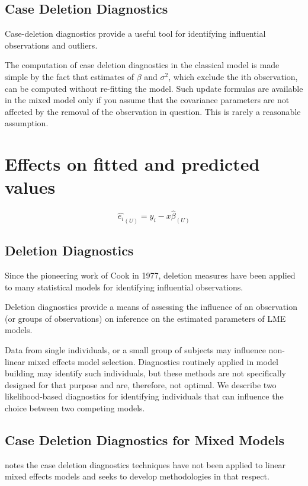 \documentclass[12pt, a4paper]{report}
\theoremstyle{plain}
\theoremstyle{definition}
\theoremstyle{remark}
\begin{document}
\subsection{Case Deletion Diagnostics}
Case-deletion diagnostics provide a useful tool for identifying influential observations and outliers.


The computation of case deletion diagnostics in the classical model is made simple by the fact that estimates of $\beta$ and $\sigma^2$, which exclude the ith observation, can be computed without re-fitting the model. Such update formulas are available in the mixed model only if you assume that the covariance parameters are not affected by the removal of the observation in question. This is rarely a reasonable assumption.

\section{Effects on fitted and predicted values}
\begin{equation}
\hat{e_{i}}_{(U)} = y_{i} - x\hat{\beta}_{(U)}
\end{equation}

\subsection{Deletion Diagnostics}

Since the pioneering work of Cook in 1977, deletion measures have been applied to many statistical models for identifying influential observations.

Deletion diagnostics provide a means of assessing the influence of an observation (or groups of observations) on inference on the estimated parameters of LME models.

Data from single individuals, or a small group of subjects may influence non-linear mixed effects model selection. Diagnostics routinely applied in model building may identify such individuals, but these methods are not specifically designed for that purpose and are, therefore, not optimal. We describe two likelihood-based diagnostics for identifying individuals that can influence the choice between two competing models.


\subsection{Case Deletion Diagnostics for Mixed Models}

\citet{Christiansen} notes the case deletion diagnostics techniques have not been applied to linear mixed effects models and seeks to develop methodologies in that respect.
\end{document}
